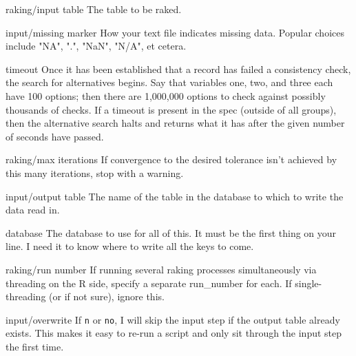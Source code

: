 \begin{key}{raking/input table}
 The table to be raked. 
\end{key}

\begin{key}{input/missing marker}
 How your text file indicates missing data. Popular choices include "NA", ".", "NaN", "N/A", et cetera.

\end{key}

\begin{key}{timeout}
 Once it has been established that a record has failed a consistency
   check, the search for alternatives begins. Say that variables one, two, and three each have 100
    options; then there are 1,000,000 options to check against possibly thousands
    of checks. If a timeout is present in the spec (outside of all groups), then the
    alternative search halts and returns what it has after the given number of seconds
    have passed.
   
\end{key}

\begin{key}{    raking/max iterations}
     If convergence to the desired tolerance isn't 
       achieved by this many iterations, stop with a warning. 
\end{key}

\begin{key}{input/output table}
 The name of the table in the database to which to write the data read in.
\end{key}

\begin{key}{database}
 The database to use for all of this. It must be the first thing on your line.
I need it to know where to write all the keys to come.
\end{key}

\begin{key}{    raking/run number}
     If running several raking processes simultaneously via
        threading on the R side, specify a separate run\_number for each. If
        single-threading (or if not sure), ignore this.
     
\end{key}

\begin{key}{input/overwrite}
 If {\tt n} or {\tt no}, I will skip the input step if the output table already exists. This makes it easy to re-run a script and only sit through the input step the first time.
\end{key}

